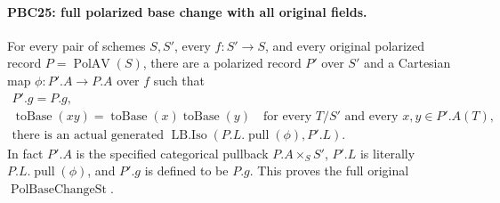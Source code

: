\documentclass[11pt,a4paper]{article}
\numberwithin{equation}{section}
\theoremstyle{remark}\newtheorem{remark}[theorem]{Remark}
\begin{document}
\paragraph{PBC25: full polarized base change with all original fields.}
\label{claim:PBC25}
For every pair of schemes $S,S'$, every $f:S'\to S$, and
every original polarized record $P=\operatorname{PolAV}(S)$,
there are a polarized record $P'$ over $S'$ and a Cartesian
map $\phi:P'.A\to P.A$ over $f$ such that
\[
 \begin{gathered}
 P'.g=P.g,\\
 \operatorname{toBase}(x y)
       =\operatorname{toBase}(x)\operatorname{toBase}(y)
       \quad\text{for every }T/S'\text{ and every }x,y\in P'.A(T),\\
 \text{there is an actual generated }
       \operatorname{LB.Iso}(P.L.\operatorname{pull}(\phi),P'.L).
 \end{gathered}                                           \tag{PBC.50}
\]
In fact $P'.A$ is the specified categorical pullback
$P.A\times_S S'$, $P'.L$ is literally $P.L.\operatorname{pull}(\phi)$,
and $P'.g$ is defined to be $P.g$.
This proves the full original $\operatorname{PolBaseChangeSt}$.
\end{document}
